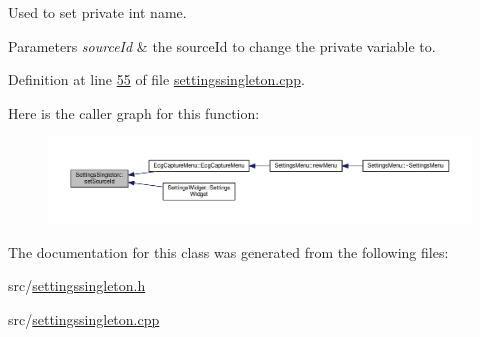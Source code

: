 Used to set private int name. 


\begin{DoxyParams}{Parameters}
{\em source\+Id} & the source\+Id to change the private variable to. \\
\hline
\end{DoxyParams}


Definition at line \hyperlink{settingssingleton_8cpp_source_l00055}{55} of file \hyperlink{settingssingleton_8cpp_source}{settingssingleton.\+cpp}.



Here is the caller graph for this function\+:
\nopagebreak
\begin{figure}[H]
\begin{center}
\leavevmode
\includegraphics[width=350pt]{classSettingsSingleton_af4b9b4364b4146711000f425dd5f5aa9_icgraph}
\end{center}
\end{figure}




The documentation for this class was generated from the following files\+:\begin{DoxyCompactItemize}
\item 
src/\hyperlink{settingssingleton_8h}{settingssingleton.\+h}\item 
src/\hyperlink{settingssingleton_8cpp}{settingssingleton.\+cpp}\end{DoxyCompactItemize}
